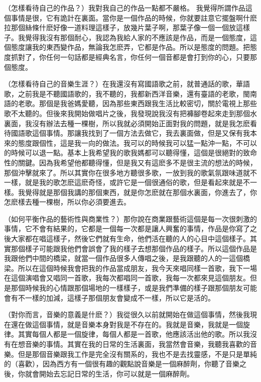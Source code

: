 \documentclass[UTF8,a4paper,oneside,twocolumn,12pt]{ctexbook}
\begin{document}
（怎樣看待自己的作品？）我對我自己的作品一點都不嚴格。
我覺得所謂作品這個事情是很，它有詭計在裏面。當你是一個作品的時候，你就要註意它擺盤啊什麽拉那個絲條什麽好像一道料理這樣子，放幾片葉子啊，那葉子像一個一個放這樣子。我覺得我沒有那個耐心，我認為我給人家的不應該是作品，而是一個態度，這個態度讓我的東西變作品，無論我怎麽弄，它都是作品。所以是態度的問題。把態度抓對了，你任何一句話都是經典名言，你任何一個音都是會打到你的心，只要那個態度。

（怎樣看待自己的音樂生涯？）在我還沒有寫國語歌之前，就普通話的歌，華語歌，之前我是不聽國語歌的，我不聽的，我都新西洋音樂，還有臺語的老歌，閩南語的老歌。那個是我爸媽愛聽，因為那些東西跟我生活比較密切，關於電視上那些歌不太聽的。但後來我開始做唱片之後，我發現說我沒有把褲腳卷起來走到那個水裏面，我沒有辦法去種一棵樹，所以我就必須開始正面對我的問題，就是我怎麽看待國語歌這個事情。那讓我找到了一個方法去做它，我去裏面做，但是又保有我本來的態度跟個性，這是我一向的做法。我可以的時候我可以猛一點沖一點，不可以的時候可以退一點。基本上我希望我的歌我媽都可以聽得懂，這個是很絕對的致命性的關鍵。因為我希望他都聽得懂，但是我又有這麽多不是很主流的想法的時候，那個沖擊就來了。所以其實你在很多地方聽很多歌，一放到我的歌氣氛跟味道就不一樣，就是我的歌怎麽這麽奇怪，或許它是一個很通俗的歌，但是看起來就是不一樣。我覺得就是那個我講的那個東西，就是你怎麽就在那個水裏面，你進去了，你怎麽樣去種一棵樹，所以你必須要進去。

（如何平衡作品的藝術性與商業性？）那你說在商業跟藝術這個是每一次很刺激的事情，它不會有結果的，它都是一個每一次都是讓人興奮的事情，作品是你寫了之後大家都在唱這樣子，然後它們就有生命，他們活在聽的人的心目中這個樣子。其實那個樣子可能跟我他們會誤會了我的樣子去想那個作品的樣子。所以這個作品是我跟他們中間的橋梁，就當一個作品很多人傳唱之後，是我跟聽的人的一這個橋梁。所以在這個時候我會把我的作品當成朋友，我今天來唱同樣一首歌，我下一場在這個演唱會又唱同一首歌，我每次都唱同一首歌，我每一次都來見這個朋友。但是那個時候我的心情跟那個場地的一樣樣子，或是我們準備的樣子跟那個朋友可能會有不一樣的加減，這樣子那個朋友會變成不一樣，所以它是活的。

（對你而言，音樂的意義是什麽？）我從很久以前就開始在做這個事情，然後我現在還在做這個事情，就是音樂本身對我是不存在的。我就是音樂，我就是一個旋律。其實每個人都是一個旋律，每個人都是一首歌，他應該活出他的歌。所以我沒有在想音樂的事情。其實在我的日常的生活裏面，我當然會音樂，我聽我喜歡的音樂。但是那個音樂跟我工作是完全沒有關系的，我也不是去找靈感，不是只是單純的（喜歡），因為西方有一個很有趣的觀點說音樂是一個麻醉劑，你聽了音樂之後，你就會開始去忘記日常的生活，你可以就是一個麻醉劑。
\end{document}
